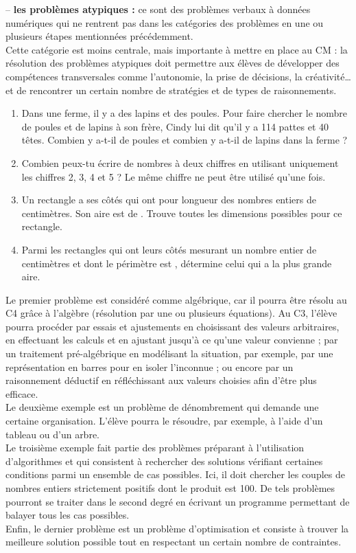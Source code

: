    -- {\bf les problèmes atypiques :} ce sont des problèmes verbaux à données numériques qui ne rentrent pas dans les catégories des problèmes en une ou plusieurs étapes mentionnées précédemment. \\
      Cette catégorie est moins centrale, mais importante à mettre en place au CM : la résolution des problèmes atypiques doit permettre aux élèves de développer des compétences transversales comme l’autonomie, la prise de décisions, la créativité\dots{} et de rencontrer un certain nombre de stratégies et de types de raisonnements.
      \begin{exemple*1}
         {\small
         \begin{enumerate}
            \item Dans une ferme, il y a des lapins et des poules. Pour faire chercher le nombre de poules et de lapins à son frère, Cindy lui dit qu’il y a 114 pattes et 40 têtes. Combien y a-t-il de poules et combien y a-t-il de lapins dans la ferme ?
            \item Combien peux-tu écrire de nombres à deux chiffres en utilisant uniquement les chiffres 2, 3, 4 et 5 ? Le même chiffre ne peut être utilisé qu’une fois.
            \item Un rectangle a ses côtés qui ont pour longueur des nombres entiers de centimètres. Son aire est de . Trouve toutes les dimensions possibles pour ce rectangle.
            \item Parmi les rectangles qui ont leurs côtés mesurant un nombre entier de centimètres et dont le périmètre est , détermine celui qui a la plus grande aire. \\ [-10mm]
         \end{enumerate}
         }
      \end{exemple*1} \medskip
      Le premier problème est considéré comme algébrique, car il pourra être résolu au C4 grâce à l'algèbre (résolution par une ou plusieurs équations). Au C3, l'élève pourra procéder par essais et ajustements en choisissant des valeurs arbitraires, en effectuant les calculs et en ajustant jusqu'à ce qu'une valeur convienne ; par un traitement pré-algébrique en modélisant la situation, par exemple, par une représentation en barres pour en isoler l'inconnue ; ou encore par un raisonnement déductif en réfléchissant aux valeurs choisies afin d'être plus efficace. \\
      Le deuxième exemple est un problème de dénombrement qui demande une certaine organisation. L'élève pourra le résoudre, par exemple, à l'aide d'un tableau ou d'un arbre. \\
      Le troisième exemple fait partie des problèmes préparant à l’utilisation d’algorithmes et qui consistent à rechercher des solutions vérifiant certaines conditions parmi un ensemble de cas possibles. Ici, il doit chercher les couples de nombres entiers strictement positifs dont le produit est 100. De tels problèmes pourront se traiter dans le second degré en écrivant un programme permettant de balayer tous les cas possibles. \\
      Enfin, le dernier problème est un problème d'optimisation et consiste à trouver la meilleure solution possible tout en respectant un certain nombre de contraintes. 
      

